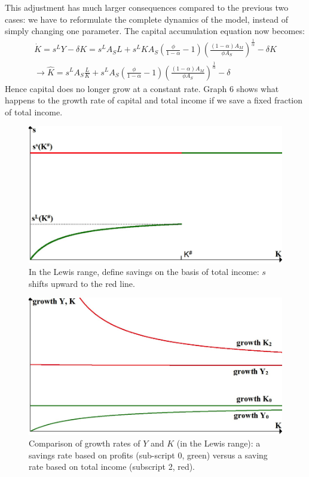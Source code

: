 \documentclass[a4paper]{article}
\begin{document}
This adjustment has much larger consequences compared to the previous two cases: we have to reformulate the complete dynamics of the model, instead of simply changing one parameter. The capital accumulation equation now becomes:
\begin{align}
\dot{K}= s^L Y-\delta K= s^L A_S L+s^L K A_S (\frac{\phi}{1-\alpha}- 1)(\frac{(1-\alpha)A_M}{\phi A_S})^{\frac{1}{\alpha}}-\delta K \nonumber \\
\rightarrow \hat{K} =s^L A_S \frac{L}{K}+s^L A_S (\frac{\phi}{1-\alpha}- 1)(\frac{(1-\alpha)A_M}{\phi A_S})^{\frac{1}{\alpha}}-\delta 
\end{align}
Hence capital does no longer grow at a constant rate. Graph 6 shows what happens to the growth rate of capital and total income if we save a fixed fraction of total income.

\begin{figure}
\includegraphics[width=\linewidth]{graph5.png}
\caption{\label{fig:Graph 5}In the Lewis range, define savings on the basis of total income: $s$ shifts upward to the red line.}
\end{figure}

\begin{figure}
\includegraphics[width=\linewidth]{graph6.png}
\caption{\label{fig:Graph 6}Comparison of growth rates of $Y$ and $K$ (in the Lewis range): a savings rate based on profits (sub-script 0, green) versus a saving rate based on total income (subscript 2, red).}
\end{figure}
\end{document}
